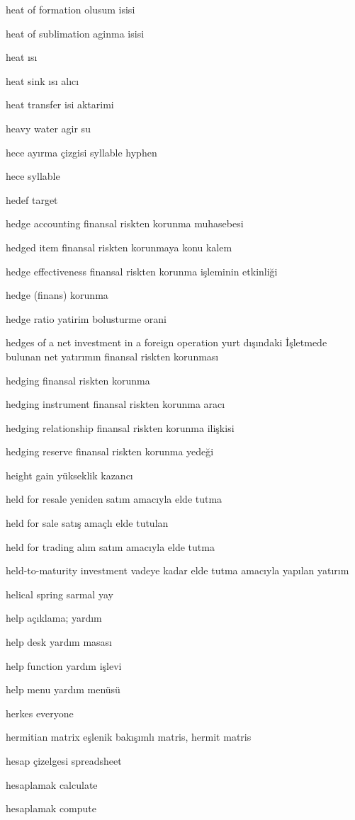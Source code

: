 \documentclass[12pt,fleqn]{article}\usepackage{../../common}
\begin{document}
heat of formation olusum isisi

heat of sublimation aginma isisi

heat ısı

heat sink ısı alıcı

heat transfer isi aktarimi

heavy water agir su

hece ayırma çizgisi syllable hyphen

hece syllable

hedef target

hedge accounting finansal riskten korunma muhasebesi

hedged item finansal riskten korunmaya konu kalem

hedge effectiveness finansal riskten korunma işleminin etkinliği

hedge (finans) korunma

hedge ratio yatirim bolusturme orani

hedges of a net investment in a foreign operation yurt dışındaki İşletmede bulunan net yatırımın finansal riskten korunması

hedging finansal riskten korunma

hedging instrument finansal riskten korunma aracı

hedging relationship finansal riskten korunma ilişkisi

hedging reserve finansal riskten korunma yedeği

height gain yükseklik kazancı

held for resale yeniden satım amacıyla elde tutma

held for sale satış amaçlı elde tutulan

held for trading alım satım amacıyla elde tutma

held-to-maturity investment vadeye kadar elde tutma amacıyla yapılan yatırım

helical spring sarmal yay

help açıklama; yardım

help desk yardım masası

help function yardım işlevi

help menu yardım menüsü

herkes everyone

hermitian matrix eşlenik bakışımlı matris, hermit matris

hesap çizelgesi spreadsheet

hesaplamak calculate

hesaplamak compute
\end{document}
